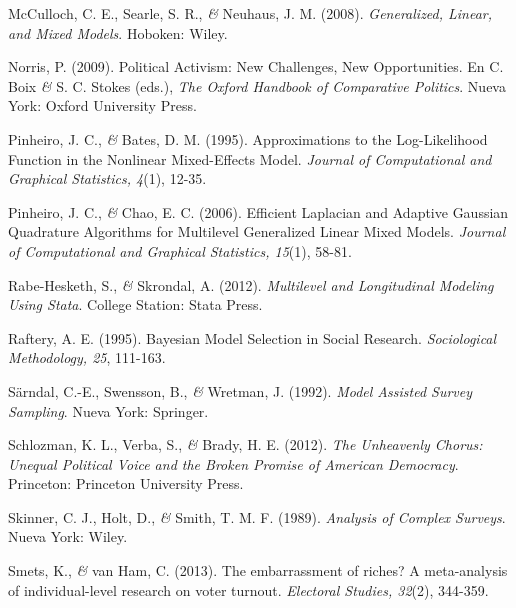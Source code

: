 \documentclass[a4paper]{tufte-handout}
\begin{document}
\begin{list}{}
\item{\small McCulloch, C. E., Searle, S. R., {\itshape \&} Neuhaus, J. M. (2008). {\itshape Generalized, Linear, and Mixed Models}. Hoboken: Wiley.}

\item{\small Norris, P. (2009). Political Activism: New Challenges, New Opportunities. En C. Boix {\itshape \&} S. C. Stokes (eds.), {\itshape The Oxford Handbook of Comparative Politics}. Nueva York: Oxford University Press.}

\item{\small Pinheiro, J. C., {\itshape \&} Bates, D. M. (1995). Approximations to the Log-Likelihood Function in the Nonlinear Mixed-Effects Model. {\itshape Journal of Computational and Graphical Statistics, 4}(1), 12-35.}

\item{\small Pinheiro, J. C., {\itshape \&} Chao, E. C. (2006). Efficient Laplacian and Adaptive Gaussian Quadrature Algorithms for Multilevel Generalized Linear Mixed Models. {\itshape Journal of Computational and Graphical Statistics, 15}(1), 58-81.}

\item{\small Rabe-Hesketh, S., {\itshape \&} Skrondal, A. (2012). {\itshape Multilevel and Longitudinal Modeling Using Stata}. College Station: Stata Press.}

\item{\small Raftery, A. E. (1995). Bayesian Model Selection in Social Research. {\itshape Sociological Methodology, 25}, 111-163.}

\item{\small Särndal, C.-E., Swensson, B., {\itshape \&} Wretman, J. (1992). {\itshape Model Assisted Survey Sampling}. Nueva York: Springer.}

\item{\small Schlozman, K. L., Verba, S., {\itshape \&} Brady, H. E. (2012). {\itshape The Unheavenly Chorus: Unequal Political Voice and the Broken Promise of American Democracy}. Princeton: Princeton University Press.}

\item{\small Skinner, C. J., Holt, D., {\itshape \&} Smith, T. M. F. (1989). {\itshape Analysis of Complex Surveys}. Nueva York: Wiley.}

\item{\small Smets, K., {\itshape \&} van Ham, C. (2013). The embarrassment of riches? A meta-analysis of individual-level research on voter turnout. {\itshape Electoral Studies, 32}(2), 344-359.}


\end{list}
\end{document}
